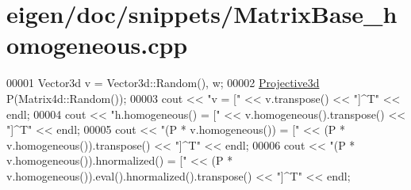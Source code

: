 \hypertarget{eigen_2doc_2snippets_2_matrix_base__homogeneous_8cpp_source}{}\section{eigen/doc/snippets/\+Matrix\+Base\+\_\+homogeneous.cpp}
\label{eigen_2doc_2snippets_2_matrix_base__homogeneous_8cpp_source}

\begin{DoxyCode}
00001 Vector3d v = Vector3d::Random(), w;
00002 \hyperlink{group___geometry___module_gab9cec8c457da930391eb73370e07aaae}{Projective3d} P(Matrix4d::Random());
00003 cout << \textcolor{stringliteral}{"v                                   = ["} << v.transpose() << \textcolor{stringliteral}{"]^T"} << endl;
00004 cout << \textcolor{stringliteral}{"h.homogeneous()                     = ["} << v.homogeneous().transpose() << \textcolor{stringliteral}{"]^T"} << endl;
00005 cout << \textcolor{stringliteral}{"(P * v.homogeneous())               = ["} << (P * v.homogeneous()).transpose() << \textcolor{stringliteral}{"]^T"} << endl;
00006 cout << \textcolor{stringliteral}{"(P * v.homogeneous()).hnormalized() = ["} << (P * v.homogeneous()).eval().hnormalized().transpose()
       << \textcolor{stringliteral}{"]^T"} << endl;
\end{DoxyCode}
